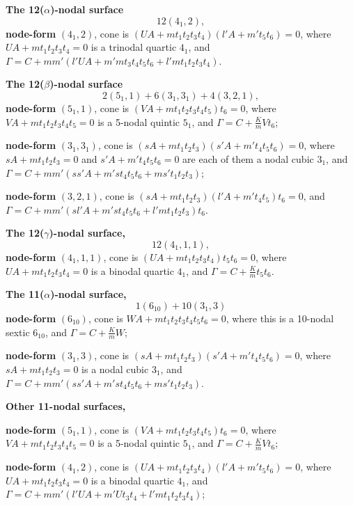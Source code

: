 \documentclass[11pt,a4paper]{article}
\begin{document}
\vspace{0.5em}
\textbf{The 12($\alpha$)-nodal surface}
\[12(4_1, 2),\]
\textbf{node-form} $(4_1, 2)$,
cone is $(UA + mt_1t_2t_3t_4)(l'A + m't_5t_6) = 0$,
where $UA + mt_1t_2t_3t_4 = 0$ is a trinodal quartic $4_1$,
and $\Gamma = C + mm'(l'UA + m'mt_3t_4t_5t_6 + l'mt_1t_2t_3t_4)$.

\vspace{0.5em}
\textbf{The 12($\beta$)-nodal surface}
\[2(5_1, 1) + 6(3_1, 3_1) + 4(3, 2, 1),\]
\textbf{node-form} $(5_1, 1)$,
cone is $(VA + mt_1t_2t_3t_4t_5)t_6 = 0$,
where $VA + mt_1t_2t_3t_4t_5 = 0$ is a 5-nodal quintic $5_1$,
and $\Gamma = C + \frac{K}{m}Vt_6$;

\textbf{node-form} $(3_1, 3_1)$,
cone is $(sA + mt_1t_2t_3)(s'A + m't_4t_5t_6) = 0$,
where $sA + mt_1t_2t_3 = 0$ and $s'A + m't_4t_5t_6 = 0$ are each of them a nodal cubic $3_1$,
and $\Gamma = C + mm'(ss'A + m'st_4t_5t_6 + ms't_1t_2t_3)$;

\textbf{node-form} $(3, 2, 1)$,
cone is $(sA + mt_1t_2t_3)(l'A + m't_4t_5)t_6 = 0$,
and $\Gamma = C + mm'(sl'A + m'st_4t_5t_6 + l'mt_1t_2t_3)t_6$.

\vspace{0.5em}
\textbf{The 12($\gamma$)-nodal surface,}
\[12(4_1, 1, 1),\]
\textbf{node-form} $(4_1, 1, 1)$,
cone is $(UA + mt_1t_2t_3t_4)t_5t_6 = 0$,
where $UA + mt_1t_2t_3t_4 = 0$ is a binodal quartic $4_1$,
and $\Gamma = C + \frac{K}{m}t_5t_6$.

\vspace{0.5em}
\textbf{The 11($\alpha$)-nodal surface,}
\[1(6_{10}) + 10(3_1, 3)\]
\textbf{node-form} $(6_{10})$,
cone is $WA + mt_1t_2t_3t_4t_5t_6 = 0$,
where this is a 10-nodal sextic $6_{10}$,
and $\Gamma = C + \frac{K}{m}W$;

\textbf{node-form} $(3_1, 3)$,
cone is $(sA + mt_1t_2t_3)(s'A + m't_4t_5t_6) = 0$,
where $sA + mt_1t_2t_3 = 0$ is a nodal cubic $3_1$,
and $\Gamma = C + mm'(ss'A + m'st_4t_5t_6 + ms't_1t_2t_3)$.

\vspace{0.5em}
\textbf{Other 11-nodal surfaces,}

\textbf{node-form} $(5_1, 1)$,
cone is $(VA + mt_1t_2t_3t_4t_5)t_6 = 0$,
where $VA + mt_1t_2t_3t_4t_5 = 0$ is a 5-nodal quintic $5_1$,
and $\Gamma = C + \frac{K}{m}Vt_6$;

\textbf{node-form} $(4_1, 2)$,
cone is $(UA + mt_1t_2t_3t_4)(l'A + m't_5t_6) = 0$,
where $UA + mt_1t_2t_3t_4 = 0$ is a binodal quartic $4_1$,
and $\Gamma = C + mm'(l'UA + m'Ut_3t_4 + l'mt_1t_2t_3t_4)$;
\end{document}
